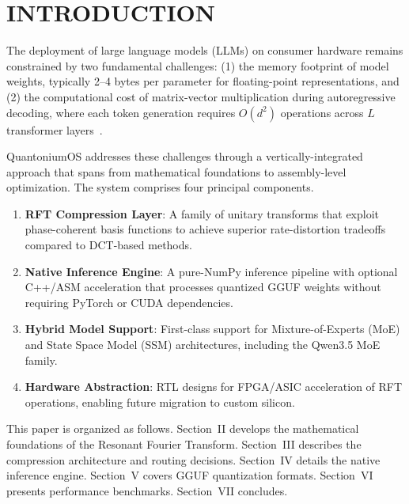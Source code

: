 \documentclass[aip,twocolumn,letterpaper]{revtex4}
\begin{document}
\section{INTRODUCTION}

The deployment of large language models (LLMs) on consumer hardware remains constrained by two fundamental challenges: (1) the memory footprint of model weights, typically 2--4 bytes per parameter for floating-point representations, and (2) the computational cost of matrix-vector multiplication during autoregressive decoding, where each token generation requires \(O(d^2)\) operations across \(L\) transformer layers~\cite{vaswani2017, touvron2023}.

QuantoniumOS addresses these challenges through a vertically-integrated approach that spans from mathematical foundations to assembly-level optimization. The system comprises four principal components.

\begin{enumerate}
\item \textbf{RFT Compression Layer}: A family of unitary transforms that exploit phase-coherent basis functions to achieve superior rate-distortion tradeoffs compared to DCT-based methods.

\item \textbf{Native Inference Engine}: A pure-NumPy inference pipeline with optional C++/ASM acceleration that processes quantized GGUF weights without requiring PyTorch or CUDA dependencies.

\item \textbf{Hybrid Model Support}: First-class support for Mixture-of-Experts (MoE) and State Space Model (SSM) architectures, including the Qwen3.5 MoE family.

\item \textbf{Hardware Abstraction}: RTL designs for FPGA/ASIC acceleration of RFT operations, enabling future migration to custom silicon.
\end{enumerate}

This paper is organized as follows. Section~II develops the mathematical foundations of the Resonant Fourier Transform. Section~III describes the compression architecture and routing decisions. Section~IV details the native inference engine. Section~V covers GGUF quantization formats. Section~VI presents performance benchmarks. Section~VII concludes.
\end{document}
